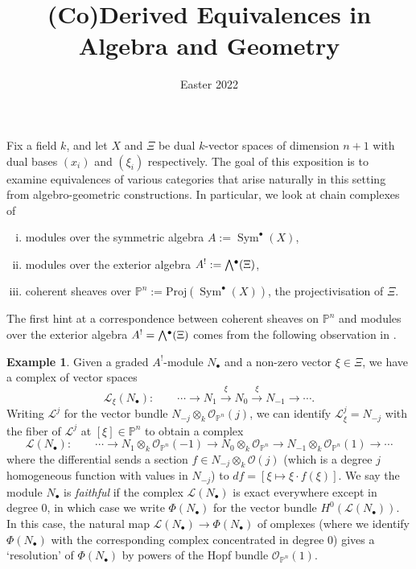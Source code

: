 \documentclass[a4paper]{article}
\title{(Co)Derived Equivalences in Algebra and Geometry}
\date{\vspace{-2.5em} Easter 2022}
\theoremstyle{definition}
\newtheorem{example}[defn]{Example}
\theoremstyle{remark}
\newcommand{\Exter}{\mathchoice{{\textstyle\bigwedge}}%
    {{\bigwedge}}%
    {{\textstyle\wedge}}%
    {{\scriptstyle\wedge}}}
\DeclareMathOperator{\Sym}{\text{Sym}}
\DeclareMathOperator{\exterior}{\Exter^\bullet}
\newcommand{\Proj}{\ensuremath{\text{Proj}}}
\newcommand{\Pn}{\ensuremath{{\mathbb{P}^n}}}
\begin{document}
 


\maketitle
\tableofcontents 

\vspace{1em}

Fix a field \(k\), and let \(X\) and \(\Xi\) be dual \(k\)-vector spaces of
dimension \(n+1\) with dual bases \((x_i)\) and \((\xi_i)\) respectively. The goal
of this exposition is to examine equivalences of various categories that arise
naturally in this setting from algebro-geometric constructions. In particular,
we look at chain complexes of 
\begin{enumerate}[(i)]
    \item modules over the symmetric algebra \(A:=
        \Sym^\bullet(X)\),
    \item modules over the exterior algebra \(A^!:= \exterior(\Xi)\),
    \item coherent sheaves over \(\Pn := \Proj(\Sym^\bullet (X))\), the
        projectivisation of \(\Xi\).
\end{enumerate}

The first hint at a correspondence between coherent sheaves on \(\Pn\) and
modules over the exterior algebra \(A^!=\exterior(\Xi)\) comes from the
following observation in .

\begin{example}\label{bgg-thm1functor}
    Given a graded \(A^!\)-module \(N_\bullet\) and a non-zero vector \(\xi\in
    \Xi\), we have a complex of vector spaces 
    \[\mathscr{L}_\xi(N_\bullet): \qquad \cdots \rightarrow N_{1} \xrightarrow{\;\xi\;} N_0 \xrightarrow{\;\xi\;} N_{-1} \rightarrow \cdots. \]
    Writing \(\mathscr{L}^j\) for the vector bundle \(N_{-j}\otimes_k
    \mathscr{O}_{\Pn}(j)\), we can identify \(\mathscr{L}_\xi^j = N_{-j}\) with the
    fiber of \(\mathscr{L}^j\) at \([\xi]\in \Pn\) to obtain a complex 
    \[\mathscr{L}(N_\bullet): \qquad \cdots \rightarrow N_{1}\otimes_k
    \mathscr{O}_{\Pn}(-1) \longrightarrow N_{0}\otimes_k
    \mathscr{O}_{\Pn} \longrightarrow N_{-1}\otimes_k \mathscr{O}_{\Pn}(1)
    \rightarrow \cdots\] where the differential sends a section \(f\in
    N_{-j}\otimes_k \mathscr{O}(j)\) (which is a degree \(j\) homogeneous
    function with values in \(N_{-j}\)) to \(df = [\xi \mapsto \xi \cdot
    f(\xi)]\). We say the module \(N_\bullet\) is \textit{faithful} if the
    complex \(\mathcal{L}(N_\bullet)\) is exact everywhere except in degree
    \(0\), in which case we write \(\Phi(N_\bullet)\) for the vector bundle
    \(H^0(\mathcal{L}(N_\bullet))\). In this case, the natural map
    \(\mathcal{L}(N_\bullet) \rightarrow \Phi(N_\bullet)\) of omplexes
    (where we identify \(\Phi(N_\bullet)\) with the corresponding complex
    concentrated in degree \(0\)) gives a `resolution' of \(\Phi(N_\bullet)\) by
    powers of the Hopf bundle \(\mathscr{O}_{\Pn}(1)\).
\end{example}
\end{document}
